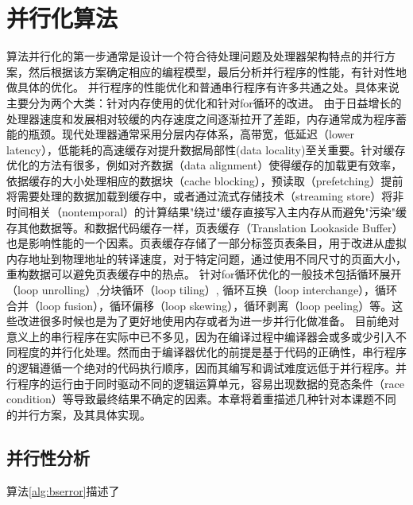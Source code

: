 \chapter{并行化算法}
\label{chp:4}

算法并行化的第一步通常是设计一个符合待处理问题及处理器架构特点的并行方案，然后根据该方案确定相应的编程模型，最后分析并行程序的性能，有针对性地做具体的优化。
并行程序的性能优化和普通串行程序有许多共通之处。具体来说主要分为两个大类：针对内存使用的优化和针对for循环的改进。
由于日益增长的处理器速度和发展相对较缓的内存速度之间逐渐拉开了差距，内存通常成为程序蓄能的瓶颈。现代处理器通常采用分层内存体系，高带宽，低延迟（lower latency），低能耗的高速缓存对提升数据局部性(data locality)至关重要。针对缓存优化的方法有很多，例如对齐数据（data alignment）使得缓存的加载更有效率，依据缓存的大小处理相应的数据块（cache blocking），预读取（prefetching）提前将需要处理的数据加载到缓存中，或者通过流式存储技术（streaming store）将非时间相关（nontemporal）的计算结果"绕过"缓存直接写入主内存从而避免"污染"缓存其他数据等。和数据代码缓存一样，页表缓存（Translation Lookaside Buffer）也是影响性能的一个因素。页表缓存存储了一部分标签页表条目，用于改进从虚拟内存地址到物理地址的转译速度，对于特定问题，通过使用不同尺寸的页面大小，重构数据可以避免页表缓存中的热点。
针对for循环优化的一般技术包括循环展开（loop unrolling）,分块循环（loop tiling）, 循环互换（loop interchange），循环合并（loop fusion），循环偏移（loop skewing），循环剥离（loop peeling）等。这些改进很多时候也是为了更好地使用内存或者为进一步并行化做准备。
目前绝对意义上的串行程序在实际中已不多见，因为在编译过程中编译器会或多或少引入不同程度的并行化处理。然而由于编译器优化的前提是基于代码的正确性，串行程序的逻辑遵循一个绝对的代码执行顺序，因而其编写和调试难度远低于并行程序。并行程序的运行由于同时驱动不同的逻辑运算单元，容易出现数据的竞态条件（race condition）等导致最终结果不确定的因素。本章将着重描述几种针对本课题不同的并行方案，及其具体实现。

\section{并行性分析}
\label{sec:parallelism}
算法\ref{alg:bserror}描述了










